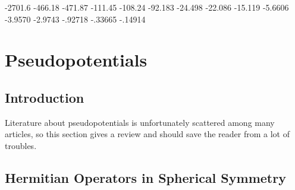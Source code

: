 -2701.6 -466.18 -471.87 -111.45 -108.24 -92.183 -24.498 -22.086 -15.119 -5.6606 -3.9570 -2.9743 -.92718 -.33665 -.14914

\section{Pseudopotentials}

\subsection{Introduction}

Literature about pseudopotentials is unfortunately scattered among many articles, so this section gives a review and should save the reader from a lot of troubles.

\subsection{Hermitian Operators in Spherical Symmetry}

